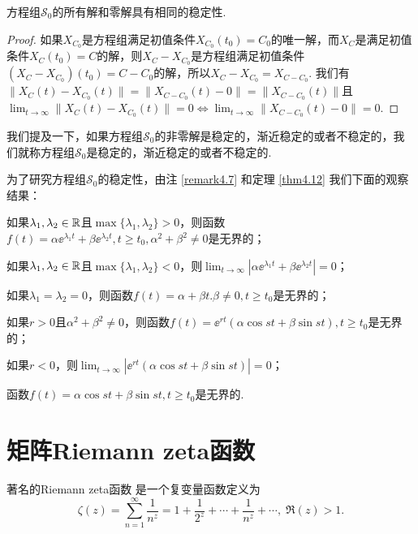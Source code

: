 \begin{theorem}
  方程组$\mathscr S_0$的所有解和零解具有相同的稳定性.
\end{theorem}

\begin{proof}
  如果$X_{C_0}$是方程组满足初值条件$X_{C_0}(t_0)=C_0$的唯一解，而$X_C$是满足初值条件$X_C(t_0)=C$的解，则$X_C-X_{C_0}$是方程组满足初值条件$(X_C-X_{C_0})(t_0)=C-C_0$的解，所以$X_C-X_{C_0}=X_{C-C_0}$. 我们有$\|X_C(t)-X_{C_0}(t)\|=\|X_{C-C_0}(t)-0\|=\|X_{C-C_0}(t)\|$且
  $\lim_{t\to\infty}\|X_C(t)-X_{C_0}(t)\|=0
  \Leftrightarrow\lim_{t\to\infty}\|X_{C-C_0}(t)-0\|=0$.
\end{proof}

\begin{remark}
  我们提及一下，如果方程组$\mathscr S_0$的非零解是稳定的，渐近稳定的或者不稳定的，我们就称方程组$\mathscr S_0$是稳定的，渐近稳定的或者不稳定的.
\end{remark}

为了研究方程组$\mathscr S_0$的稳定性，由注 \ref{remark4.7} 和定理 \ref{thm4.12} 我们下面的观察结果：
\begin{enum}
  \item 如果$\lambda_1,\lambda_2\in\mathbb R$且$\max\{\lambda_1,
      \lambda_2\}>0$，则函数$f(t)=\alpha\ee^{\lambda_1t}+\beta\ee^{\lambda_2t},t\ge t_0,\alpha^2+\beta^2\ne0$是无界的；
  \item 如果$\lambda_1,\lambda_2\in\mathbb R$且$\max\{\lambda_1,
      \lambda_2\}<0$，则$\lim_{t\to\infty}|\alpha
      \ee^{\lambda_1t}+\beta\ee^{\lambda_2t}|=0$；
  \item\label{remark4.8c} 如果$\lambda_1=\lambda_2=0$，则函数$f(t)=\alpha+\beta t.\beta\ne0,t\ge t_0$是无界的；
  \item\label{remark4.8d} 如果$r>0$且$\alpha^2+\beta^2\ne0$，则函数$f(t)=\ee^{rt}(\alpha\cos st+\beta\sin st),t\ge t_0$是无界的；
  \item 如果$r<0$，则$\lim_{t\to\infty}|\ee^{rt}(\alpha\cos st+\beta \sin st)|=0$；
  \item 函数$f(t)=\alpha\cos st+\beta \sin st,t\ge t_0$是无界的.
\end{enum}

\section{矩阵Riemann zeta函数}
著名的Riemann zeta函数 \cite[p.265]{61}是一个复变量函数定义为
\[
  \zeta(z) = \sum_{n=1}^\infty \frac1{n^z} = 1 + \frac1{2^z} + \cdots + \frac1{n^z} + \cdots ,\;\Re(z)>1.
\]

